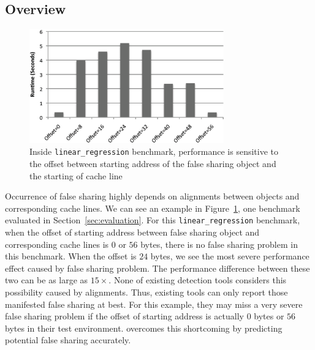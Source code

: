 \label{sec:prediction}

\subsection{Overview}
\label{sec:predictoverview}

\begin{figure}[!h]
\begin{center}
\includegraphics[width=3.3in]{fig/perfsensitive}
\end{center}
\caption{
Inside \texttt{linear\_regression} benchmark,
performance is sensitive to the offset between starting address of the false sharing object 
and the starting of cache line 
\label{fig:perfsensitive}}
\end{figure}

Occurrence of false sharing highly depends on 
alignments between objects and corresponding cache lines.
We can see an example in Figure~\ref{fig:perfsensitive}, one benchmark evaluated in
Section~\ref{sec:evaluation}. 
For this \texttt{linear\_regression} benchmark,
when the offset of starting address between false sharing object and corresponding cache lines 
is $0$ or $56$ bytes, 
there is no false sharing problem in this benchmark. 
When the offset is $24$ bytes, we see the most severe performance effect caused 
by false sharing problem. 
The performance difference between these two can be as large as $15\times$.
None of existing detection tools considers this possibility caused by alignments. 
Thus, existing tools can only report those manifested false sharing at best. 
For this example, they may miss a very severe false sharing problem if the offset of starting 
address is actually $0$ bytes or $56$ bytes in their test environment.
\Predator{} overcomes this shortcoming by predicting potential false sharing accurately. 

